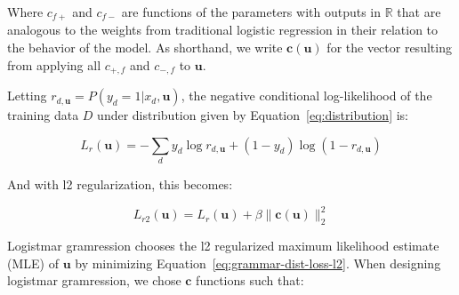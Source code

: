 \documentclass[11pt,letterpaper]{article}
\begin{document}
Where 
$c_{f+}$ and $c_{f-}$ are functions of the parameters with
outputs in $\mathbb{R}$ that are analogous to the 
weights from traditional
logistic regression in their relation to
 the behavior of the model. As shorthand, we write 
 $\mathbf{c}(\mathbf{u})$ for the vector resulting
 from applying all $c_{+,f}$ and $c_{-,f}$ to $\mathbf{u}$.
 
Letting $r_{d,\mathbf{u}}=P(y_d=1|x_d,\mathbf{u})$, the negative
conditional log-likelihood of the training data $D$ under
distribution given by Equation~\ref{eq:distribution}
is:

\begin{equation}
\label{eq:grammar-dist-loss}
L_r(\mathbf{u})=-\sum_d y_d\log r_{d,\mathbf{u}}+
(1-y_d)\log (1-r_{d,\mathbf{u}})
\end{equation}

And with l2 regularization, this becomes:

\begin{equation}
\label{eq:grammar-dist-loss-l2}
L_{r2}(\mathbf{u})=L_r(\mathbf{u})+
\beta \|\mathbf{c}(\mathbf{u})\|^2_2
\end{equation}

Logistmar gramression chooses the l2 regularized maximum 
likelihood estimate (MLE) of $\mathbf{u}$ by minimizing 
Equation~\ref{eq:grammar-dist-loss-l2}.  When designing logistmar
gramression, we chose $\mathbf{c}$ functions such 
that:
\end{document}
